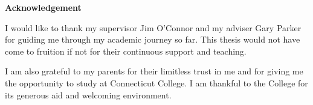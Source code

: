 
\begin{center}
    \vspace{0.9cm}
    \textbf{Acknowledgement}
\end{center}

I would like to thank my supervisor Jim O'Connor and my adviser Gary Parker for guiding me through my academic journey so far. This thesis would not have come to fruition if not for their continuous support and teaching. 

I am also grateful to my parents for their limitless trust in me and for giving me the opportunity to study at Connecticut College. I am thankful to the College for its generous aid and welcoming environment.

\newpage